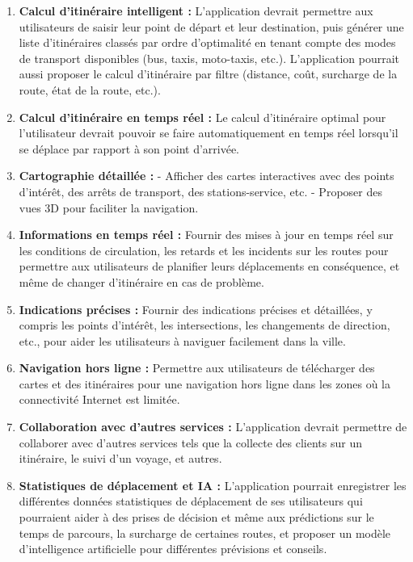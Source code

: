 \documentclass{article}
\begin{document}
\begin{enumerate}
\item \textbf{Calcul d'itinéraire intelligent :}
L’application devrait permettre aux utilisateurs de saisir leur point de départ et leur destination, puis générer une liste d'itinéraires classés par ordre d'optimalité en tenant compte des modes de transport disponibles (bus, taxis, moto-taxis, etc.). L'application pourrait aussi proposer le calcul d'itinéraire par filtre (distance, coût, surcharge de la route, état de la route, etc.).
\item \textbf{Calcul d'itinéraire en temps réel :}
Le calcul d'itinéraire optimal pour l'utilisateur devrait pouvoir se faire automatiquement en temps réel lorsqu'il se déplace par rapport à son point d'arrivée.

\item \textbf{Cartographie détaillée :}
- Afficher des cartes interactives avec des points d’intérêt, des arrêts de transport, des stations-service, etc.
- Proposer des vues 3D pour faciliter la navigation.

\item \textbf{Informations en temps réel :}
Fournir des mises à jour en temps réel sur les conditions de circulation, les retards et les incidents sur les routes pour permettre aux utilisateurs de planifier leurs déplacements en conséquence, et même de changer d'itinéraire en cas de problème.

\item \textbf{Indications précises :}
Fournir des indications précises et détaillées, y compris les points d'intérêt, les intersections, les changements de direction, etc., pour aider les utilisateurs à naviguer facilement dans la ville.

\item \textbf{Navigation hors ligne :}
Permettre aux utilisateurs de télécharger des cartes et des itinéraires pour une navigation hors ligne dans les zones où la connectivité Internet est limitée.

\item \textbf{Collaboration avec d'autres services :}
L'application devrait permettre de collaborer avec d'autres services tels que la collecte des clients sur un itinéraire, le suivi d'un voyage, et autres.

\item \textbf{Statistiques de déplacement et IA :}
L'application pourrait enregistrer les différentes données statistiques de déplacement de ses utilisateurs qui pourraient aider à des prises de décision et même aux prédictions sur le temps de parcours, la surcharge de certaines routes, et proposer un modèle d'intelligence artificielle pour différentes prévisions et conseils.


\end{enumerate}
\end{document}
